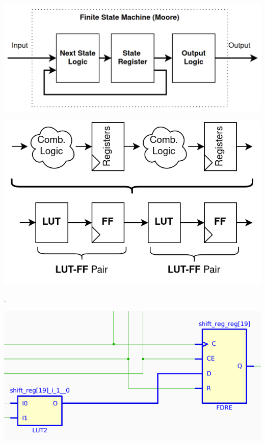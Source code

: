 \documentclass{article}
\begin{document}
\begin{multicols}{2}
        \vspace{1.0cm}
        {
            \centering
            \includegraphics[width=\columnwidth]{figures/fsm.png}
            \label{fig:fsm}
        }
        \vspace{1.0cm}

        {
            \centering
            \includegraphics[width=0.9\columnwidth]{figures/pipelining.png}
            \label{fig:pipelining}
        }

        \vfill
        .
        \newcolumn

        {
            \centering
            \includegraphics[width=0.9\columnwidth]{figures/lut_ff_pair.png}
            \label{fig:lut_ff_pair}
        }
        \vspace{1.0cm}


\end{multicols}
\end{document}
